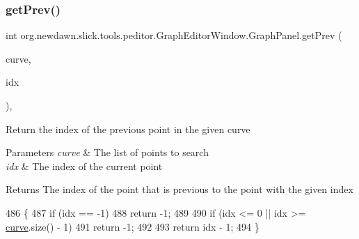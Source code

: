 \subsubsection{\texorpdfstring{get\+Prev()}{getPrev()}}
{\footnotesize\ttfamily int org.\+newdawn.\+slick.\+tools.\+peditor.\+Graph\+Editor\+Window.\+Graph\+Panel.\+get\+Prev (\begin{DoxyParamCaption}\item[{Array\+List}]{curve,  }\item[{int}]{idx }\end{DoxyParamCaption})\hspace{0.3cm}{\ttfamily [inline]}, {\ttfamily [private]}}

Return the index of the previous point in the given curve


\begin{DoxyParams}{Parameters}
{\em curve} & The list of points to search \\
\hline
{\em idx} & The index of the current point \\
\hline
\end{DoxyParams}
\begin{DoxyReturn}{Returns}
The index of the point that is previous to the point with the given index 
\end{DoxyReturn}

\begin{DoxyCode}
486                                                       \{
487             \textcolor{keywordflow}{if} (idx == -1)
488                 \textcolor{keywordflow}{return} -1;
489 
490             \textcolor{keywordflow}{if} (idx <= 0 || idx >= \mbox{\hyperlink{classorg_1_1newdawn_1_1slick_1_1tools_1_1peditor_1_1_graph_editor_window_1_1_graph_panel_ac95a7a77b5e8460041f157c02e19d2bb}{curve}}.size() - 1)
491                 \textcolor{keywordflow}{return} -1;
492 
493             \textcolor{keywordflow}{return} idx - 1;
494         \}
\end{DoxyCode}
\mbox{\label{classorg_1_1newdawn_1_1slick_1_1tools_1_1peditor_1_1_graph_editor_window_1_1_graph_panel_ae2daab30f35b5ee4e54807c77f442670}} 
